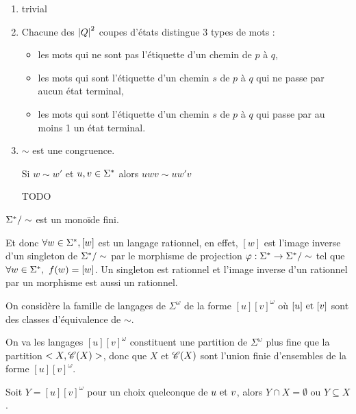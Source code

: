 \begin{proofI}
	\begin{enumerate}
		\item  trivial
		\item Chacune des ${\left|Q\right|}^2$ coupes d'états distingue 3 types de mots :
		      \begin{itemize}
			      \item les mots qui ne sont pas l'étiquette d'un chemin de $p$ à $q$,
			      \item les mots qui sont l'étiquette d'un chemin $s$ de $p$ à $q$ qui ne passe par aucun état terminal,
			      \item les mots qui sont l'étiquette d'un chemin $s$ de $p$ à $q$ qui passe par au moins 1 un état terminal.
		      \end{itemize}
		\item $\sim$ est une congruence.

		      Si $w \sim w'$ et $u,v \in \Sigma^{*}$ alors $uwv \sim uw'v$

		      TODO
	\end{enumerate}
\end{proofI}

\begin{remarque}
	$\Sigma^{*} / \sim$ est un monoïde fini.

	Et donc $\forall w \in \Sigma^{*}, [w]$ est un langage rationnel, en effet, $[w]$ est l'image inverse d'un singleton de $\Sigma^{*} / \sim$
	par le morphisme de projection $\varphi : \Sigma^{*} \to \Sigma^{*} / \sim$ tel que $\forall w \in \Sigma^{*},\ f (w) = [w] $. Un singleton est rationnel et
	l'image inverse d'un rationnel par un morphisme est aussi un rationnel.
\end{remarque}


On considère la famille de langages de $\Sigma^{\omega}$ de la forme $[u][v]^{\omega}$ où $[u] \text{ et } [v]$ sont des classes d'équivalence de $\sim$.

On va \mq les langages $[u][v]^{\omega}$ constituent une partition de $\Sigma^{\omega}$ plus fine que la partition $<X,\mathscr{C}(X)>$,
donc que $X$ et $\mathscr{C} (X)$ sont l'union finie d'ensembles de la forme $[u][v]^{\omega}$.

\begin{prop}\label{prop:buchi1}
	Soit $Y = [u][v]^{\omega}$ pour un choix quelconque de $u \text{ et } v$, alors $Y \cap X = \emptyset$ ou $Y \subseteq X$.
\end{prop}


